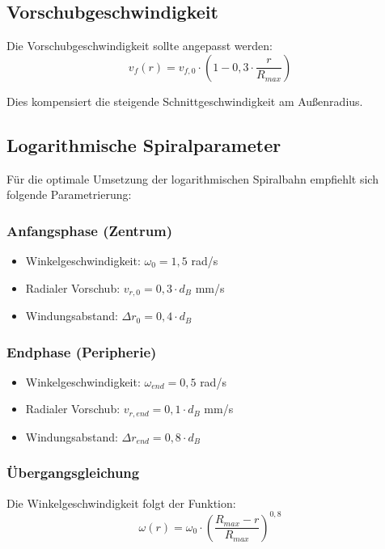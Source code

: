 ﻿\documentclass[12pt,a4paper]{article}
\begin{document}
\subsection{Vorschubgeschwindigkeit}

Die Vorschubgeschwindigkeit sollte angepasst werden:
\begin{equation}
	v_f(r) = v_{f,0} \cdot \left(1 - 0{,}3 \cdot \frac{r}{R_{max}}\right)
\end{equation}

Dies kompensiert die steigende Schnittgeschwindigkeit am Außenradius.

\subsection{Logarithmische Spiralparameter}

Für die optimale Umsetzung der logarithmischen Spiralbahn empfiehlt sich folgende Parametrierung:

\subsubsection{Anfangsphase (Zentrum)}
\begin{itemize}
	\item Winkelgeschwindigkeit: $\omega_0 = 1{,}5$ rad/s
	\item Radialer Vorschub: $v_{r,0} = 0{,}3 \cdot d_B$ mm/s
	\item Windungsabstand: $\Delta r_0 = 0{,}4 \cdot d_B$
\end{itemize}

\subsubsection{Endphase (Peripherie)}
\begin{itemize}
	\item Winkelgeschwindigkeit: $\omega_{end} = 0{,}5$ rad/s
	\item Radialer Vorschub: $v_{r,end} = 0{,}1 \cdot d_B$ mm/s
	\item Windungsabstand: $\Delta r_{end} = 0{,}8 \cdot d_B$
\end{itemize}

\subsubsection{Übergangsgleichung}
Die Winkelgeschwindigkeit folgt der Funktion:
\begin{equation}
	\omega(r) = \omega_0 \cdot \left(\frac{R_{max} - r}{R_{max}}\right)^{0{,}8}
\end{equation}
\end{document}
